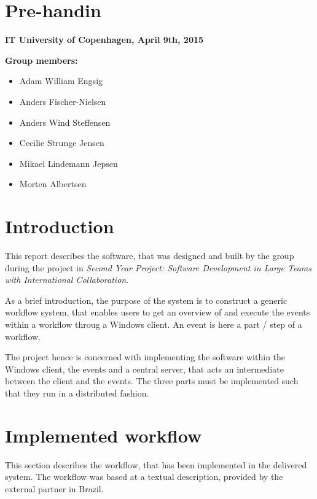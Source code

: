 \section{Pre-handin}\label{pre-handin}


\textbf{IT University of Copenhagen, April 9th, 2015}

\textbf{Group members:}

\begin{itemize}
\itemsep1pt\parskip0pt
\item
  Adam William Engsig
\item
  Anders Fischer-Nielsen
\item
  Anders Wind Steffensen
\item
  Cecilie Strunge Jensen
\item
  Mikael Lindemann Jepsen
\item
  Morten Albertsen
\end{itemize}

\newpage

\section{Introduction}\label{introduction}

This report describes the software, that was designed and built by the
group during the project in \emph{Second Year Project: Software
Development in Large Teams with International Collaboration}.

As a brief introduction, the purpose of the system is to construct a
generic workflow system, that enables users to get an overview of and
execute the events within a workflow throug a Windows client. An event
is here a part / step of a workflow.

The project hence is concerned with implementing the software within the
Windows client, the events and a central server, that acts an
intermediate between the client and the events. The three parts must be
implemented such that they run in a distributed fashion.

\section{Implemented workflow}\label{implemented-workflow}

This section describes the workflow, that has been implemented in the
delivered system. The workflow was based at a textual description,
provided by the external partner in Brazil.

